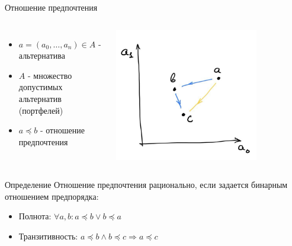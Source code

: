 \documentclass{beamer}
\begin{document}
\begin{frame}{Отношение предпочтения}

\begin{columns}
    \begin{itemize}
        \item $a=(a_0,\ldots, a_n)\in A$ - альтернатива
        \item $A$ - множество допустимых альтернатив (портфелей)
        \item $a \preceq b$ - отношение предпочтения
    \end{itemize}


\includegraphics[width=0.75\textwidth]{2_figs/transitivity.jpg}
\end{columns}


\begin{block}{Определение}
Отношение предпочтения рационально, если задается бинарным отношением предпорядка:
    \begin{itemize}
    \item Полнота: $\forall a, b: a \preceq b \lor b \preceq a$ 
    \item Транзитивность: $ a \preceq b \land b \preceq c \Rightarrow  a \preceq c$
\end{itemize}
\end{block}

    
\end{frame}
\end{document}
